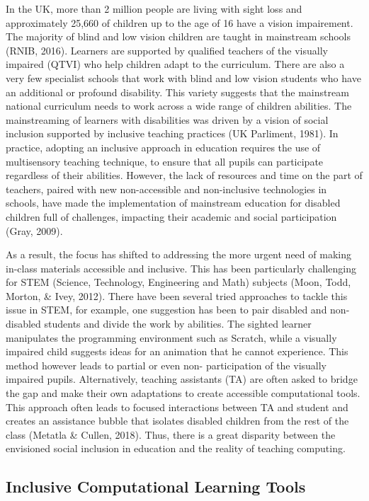\documentclass[oneside,%
                    author={Malak Hajji},
                    degree={BSc},
                    title={Designing An Accessible Computational Toolkit For Students},
                  subtitle={With Mixed Visual Abilities}]{dissertation}
\begin{document}
In the UK, more than 2 million people are living with sight loss and approximately 25,660 of children up to the age of 16 have a vision impairement. The majority of blind and low vision children are taught in mainstream schools (RNIB, 2016). Learners are supported by qualified teachers of the visually impaired (QTVI) who help children adapt to the curriculum. There are also a very few specialist schools that work with blind and low vision students who have an additional or profound disability. This variety suggests that the mainstream national curriculum needs to work across a wide range of children abilities. 
The mainstreaming of learners with disabilities was driven by a vision of social inclusion supported by inclusive teaching practices (UK Parliment, 1981). 
In practice, adopting an inclusive approach in education requires the use of multisensory teaching technique, to ensure that all pupils can participate regardless of their abilities. However, the lack of resources and time on the part of teachers, paired with new non-accessible and non-inclusive technologies in schools, have made the implementation of mainstream education for disabled children full of challenges, impacting their academic and social participation (Gray, 2009). 

As a result, the focus has shifted to addressing the more urgent need of making in-class materials accessible and inclusive. This has been particularly challenging for STEM (Science, Technology, Engineering and Math) subjects (Moon, Todd, Morton, & Ivey, 2012). There have been several tried approaches to tackle this issue in STEM, for example, one suggestion has been to pair disabled and non-disabled students and divide the work by abilities. The sighted learner manipulates the programming environment such as Scratch, while a visually impaired child suggests ideas for an animation that he cannot experience. This method however leads to partial or even non- participation of the visually impaired pupils. Alternatively, teaching assistants (TA) are often asked to bridge the gap and make their own adaptations to create accessible computational tools. This approach often leads to focused interactions between TA and student and creates an assistance bubble that isolates disabled children from the rest of the class (Metatla & Cullen, 2018). Thus, there is a great disparity between the envisioned social inclusion in education and the reality of teaching computing. 

\subsection{Inclusive Computational Learning Tools}
\end{document}
